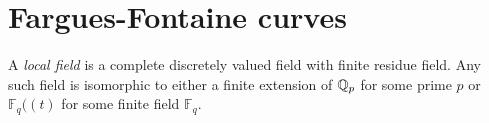 \section{Fargues-Fontaine curves}

\begin{definition} \label{def:local field}
A \emph{local field} is a complete discretely valued field with finite residue field.
Any such field is isomorphic to either a finite extension of $\mathbb{Q}_p$ for some prime $p$
or $\mathbb{F}_q((t)$ for some finite field $\mathbb{F}_q$.
\end{definition}

